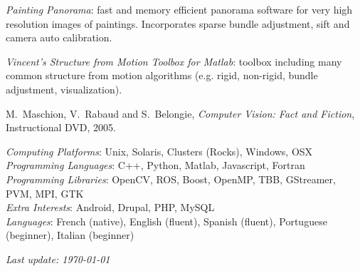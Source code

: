 \begin{llist}
{\em Painting Panorama}: fast and memory efficient panorama software for very high resolution images of paintings.  Incorporates sparse bundle adjustment, sift and camera auto calibration.

{\em Vincent's Structure from Motion Toolbox for Matlab}: toolbox including many common structure from motion algorithms (e.g. rigid, non-rigid, bundle adjustment, visualization).

M.~Maschion, V.~Rabaud and S.~Belongie, {\em Computer Vision: Fact and Fiction},
Instructional DVD, 2005.

{\em Computing Platforms}: Unix, Solaris, Clusters (Rocks), Windows, OSX\\
{\em Programming Languages}: C++, Python, Matlab, Javascript, Fortran \\
{\em Programming Libraries}: OpenCV, ROS, Boost, OpenMP, TBB, GStreamer, PVM, MPI, GTK \\
{\em Extra Interests}: Android, Drupal, PHP, MySQL \\
{\em Languages}: French (native), English (fluent), Spanish (fluent), Portuguese (beginner), Italian (beginner)





\end{llist}

{\em Last update: \today}


